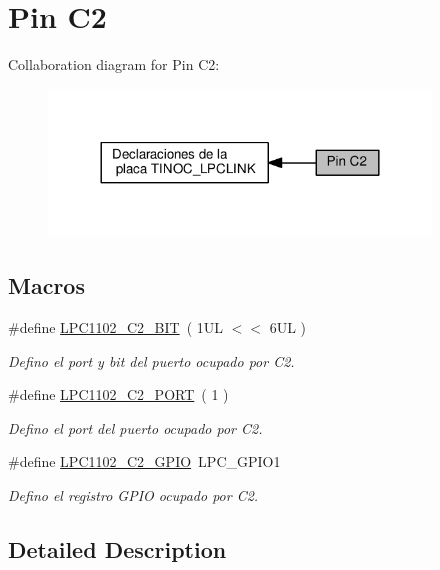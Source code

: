 \hypertarget{group___p_i_n_c2}{}\section{Pin C2}
\label{group___p_i_n_c2}
Collaboration diagram for Pin C2\+:\nopagebreak
\begin{figure}[H]
\begin{center}
\leavevmode
\includegraphics[width=288pt]{group___p_i_n_c2}
\end{center}
\end{figure}
\subsection*{Macros}
\begin{DoxyCompactItemize}
\item 
\#define \hyperlink{group___p_i_n_c2_gabce4949f6b4b70f2239eb55ac429559b}{L\+P\+C1102\+\_\+\+C2\+\_\+\+B\+IT}~( 1\+U\+L $<$$<$ 6\+U\+L )
\begin{DoxyCompactList}\small\item\em Defino el port y bit del puerto ocupado por C2. \end{DoxyCompactList}\item 
\#define \hyperlink{group___p_i_n_c2_ga50df256c7cdc2b746d468ab4ce10df85}{L\+P\+C1102\+\_\+\+C2\+\_\+\+P\+O\+RT}~( 1 )
\begin{DoxyCompactList}\small\item\em Defino el port del puerto ocupado por C2. \end{DoxyCompactList}\item 
\#define \hyperlink{group___p_i_n_c2_ga88c5ae9982021d59bd43dc9b9b22d1b9}{L\+P\+C1102\+\_\+\+C2\+\_\+\+G\+P\+IO}~L\+P\+C\+\_\+\+G\+P\+I\+O1
\begin{DoxyCompactList}\small\item\em Defino el registro G\+P\+IO ocupado por C2. \end{DoxyCompactList}\end{DoxyCompactItemize}


\subsection{Detailed Description}



